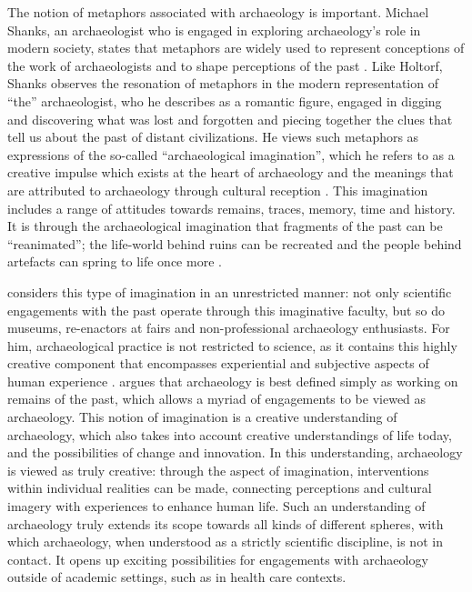 	The notion of metaphors associated with archaeology is important. Michael Shanks, an archaeologist who is engaged in exploring archaeology’s role in modern society, states that metaphors are widely used to represent conceptions of the work of archaeologists and to shape perceptions of the past \parencite[25,64]{Shanks_2012a}. Like Holtorf, Shanks observes the resonation of metaphors in the modern representation of “the” archaeologist, who he describes as a romantic figure, engaged in digging and discovering what was lost and forgotten and piecing together the clues that tell us about the past of distant civilizations. He views such metaphors as expressions of the so-called “archaeological imagination”, which he refers to as a creative impulse which exists at the heart of archaeology and the meanings that are attributed to archaeology through cultural reception \parencite[25]{Shanks_2012a}. This imagination includes a range of attitudes towards remains, traces, memory, time and history. It is through the archaeological imagination that fragments of the past can be “reanimated”; the life-world behind ruins can be recreated and the people behind artefacts can spring to life once more \parencite[9,25]{Shanks_2012a}.
	
	\textcite[17]{Shanks_2012a} considers this type of imagination in an unrestricted manner: not only scientific engagements with the past operate through this imaginative faculty, but so do museums, re-enactors at fairs and non-professional archaeology enthusiasts. For him, archaeological practice is not restricted to science, as it contains this highly creative component that encompasses experiential and subjective aspects of human experience \parencite[17]{Shanks_2012a}. \textcite[17--18]{Shanks_2012a} argues that archaeology is best defined simply as working on remains of the past, which allows a myriad of engagements to be viewed as archaeology. This notion of imagination is a creative understanding of archaeology, which also takes into account creative understandings of life today, and the possibilities of change and innovation. In this understanding, archaeology is viewed as truly creative: through the aspect of imagination, interventions within individual realities can be made, connecting perceptions and cultural imagery with experiences to enhance human life. Such an understanding of archaeology truly extends its scope towards all kinds of different spheres, with which archaeology, when understood as a strictly scientific discipline, is not in contact. It opens up exciting possibilities for engagements with archaeology outside of academic settings, such as in health care contexts.
	 		
